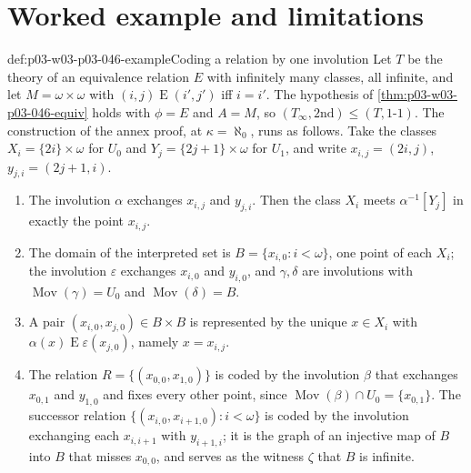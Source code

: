 \section{Worked example and limitations}
\label{sec:p03-w03-p03-046-example}

\begin{hbexample}{def:p03-w03-p03-046-example}{Coding a relation by one involution}
Let \(T\) be the theory of an equivalence relation \(E\) with infinitely
many classes, all infinite, and let \(M=\omega\times\omega\) with
\((i,j)\mathrel E(i',j')\) iff \(i=i'\). The hypothesis of
\cref{thm:p03-w03-p03-046-equiv} holds with \(\phi=E\) and \(A=M\), so
\((T_\infty,\mathrm{2nd})\le(T,\text{1-1})\). The construction of the annex
proof, at \(\kappa=\aleph_0\), runs as follows. Take the classes
\(X_i=\{2i\}\times\omega\) for \(U_0\) and \(Y_j=\{2j+1\}\times\omega\) for
\(U_1\), and write \(x_{i,j}=(2i,j)\), \(y_{j,i}=(2j+1,i)\).
\begin{enumerate}
  \item The involution \(\alpha\) exchanges \(x_{i,j}\) and \(y_{j,i}\).
        Then the class \(X_i\) meets \(\alpha^{-1}[Y_j]\) in exactly the point
        \(x_{i,j}\).
  \item The domain of the interpreted set is \(B=\{x_{i,0}:i<\omega\}\),
        one point of each \(X_i\); the involution \(\varepsilon\) exchanges
        \(x_{i,0}\) and \(y_{i,0}\), and \(\gamma,\delta\) are involutions
        with \(\operatorname{Mov}(\gamma)=U_0\) and
        \(\operatorname{Mov}(\delta)=B\).
  \item A pair \((x_{i,0},x_{j,0})\in B\times B\) is represented by the
        unique \(x\in X_i\) with \(\alpha(x)\mathrel E\varepsilon(x_{j,0})\),
        namely \(x=x_{i,j}\).
  \item The relation \(R=\{(x_{0,0},x_{1,0})\}\) is coded by the involution
        \(\beta\) that exchanges \(x_{0,1}\) and \(y_{1,0}\) and fixes every
        other point, since \(\operatorname{Mov}(\beta)\cap U_0=\{x_{0,1}\}\).
        The successor relation \(\{(x_{i,0},x_{i+1,0}):i<\omega\}\) is coded
        by the involution exchanging each \(x_{i,i+1}\) with \(y_{i+1,i}\);
        it is the graph of an injective map of \(B\) into \(B\) that misses
        \(x_{0,0}\), and serves as the witness \(\zeta\) that \(B\) is
        infinite.
\end{enumerate}
\end{hbexample}

